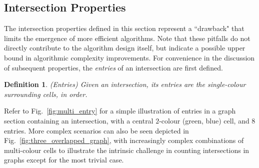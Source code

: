 \documentclass[journal]{IEEEtran}
\newtheorem{definition}[theorem]{Definition}
\newtheorem{remark}[theorem]{Remark}
\begin{document}
\subsection{Intersection Properties}
The intersection properties defined in this section represent a ``drawback" that limits the emergence of more efficient algorithms. 
Note that these pitfalls do not directly contribute to the algorithm design itself, but indicate a possible upper bound in algorithmic complexity improvements. 
For convenience in the discussion of subsequent properties, the \textit{entries} of an intersection are first defined. 
\begin{definition} %
 (Entries) Given an intersection,  its entries are the single-colour surrounding cells, in order. 
\end{definition}
Refer to Fig.~\ref{fig:multi_entry} for a simple illustration of entries in a graph section containing an intersection, with a central $2$-colour (green, blue) cell, and 8 entries.  
More complex scenarios can also be seen depicted in Fig.~\ref{fig:three_overlapped_graph}, with increasingly complex combinations of multi-colour cells to illustrate the intrinsic challenge in counting intersections in graphs except for the most trivial case. %

\end{document}
